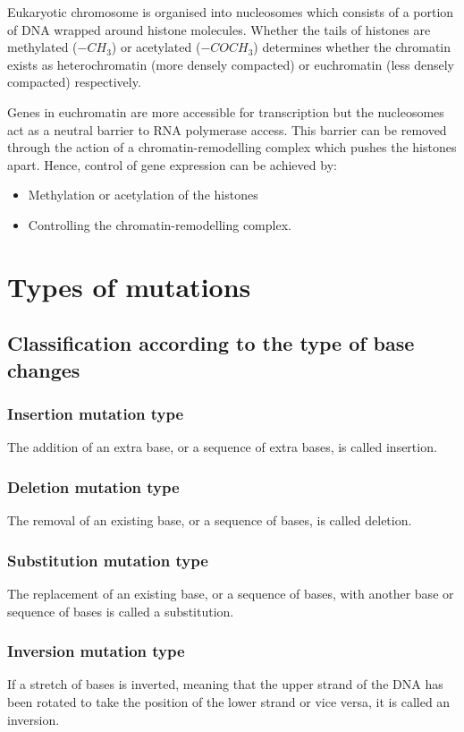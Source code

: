 \documentclass[11pt]{article}
\begin{document}
Eukaryotic chromosome is organised into nucleosomes which consists of a portion of DNA wrapped around histone molecules. Whether the tails of histones are methylated (\(-CH_3\)) or acetylated (\(-COCH_3\)) determines whether the chromatin exists as heterochromatin (more densely compacted) or euchromatin (less densely compacted) respectively.


Genes in euchromatin are more accessible for transcription but the nucleosomes act as a neutral barrier to RNA polymerase access. This barrier can be removed through the action of a chromatin-remodelling complex which pushes the histones apart. Hence, control of gene expression can be achieved by:
\begin{itemize}
\item Methylation or acetylation of the histones
\item Controlling the chromatin-remodelling complex.
\end{itemize}

\newpage
\section{Types of mutations}
\label{sec:org1605cfe}

\subsection{Classification according to the type of base changes}
\label{sec:org4c0d718}

\subsubsection{Insertion mutation type}
\label{sec:org3bb72ab}
The addition of an extra base, or a sequence of extra bases, is called insertion.
\subsubsection{Deletion mutation type}
\label{sec:org09efe6e}
The removal of an existing base, or a sequence of bases, is called deletion.
\subsubsection{Substitution mutation type}
\label{sec:orgd75f28a}
The replacement of an existing base, or a sequence of bases, with another base or sequence of bases is called a substitution.
\subsubsection{Inversion mutation type}
\label{sec:org6a1c859}
If a stretch of bases is inverted, meaning that the upper strand of the DNA has been rotated to take the position of the lower strand or vice versa, it is called an inversion.
\end{document}
